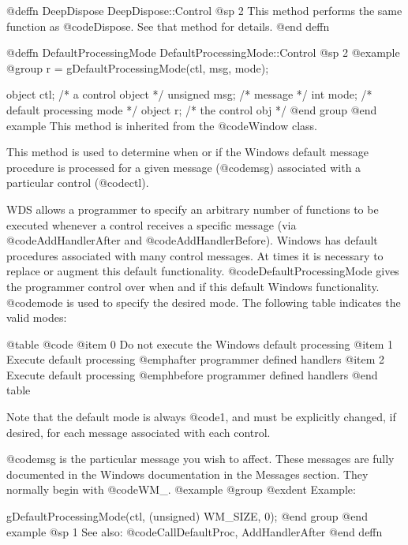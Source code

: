 @deffn {DeepDispose} DeepDispose::Control
@sp 2
This method performs the same function as @code{Dispose}.  See that
method for details.
@end deffn









@deffn {DefaultProcessingMode} DefaultProcessingMode::Control
@sp 2
@example
@group
r = gDefaultProcessingMode(ctl, msg, mode);

object   ctl;   /*  a control object         */
unsigned msg;   /*  message                  */
int      mode;  /*  default processing mode  */
object   r;     /*  the control obj          */
@end group
@end example
This method is inherited from the @code{Window} class.

This method is used to determine when or if the Windows default message
procedure is processed for a given message (@code{msg}) associated with
a particular control (@code{ctl}).

WDS allows a programmer to specify an arbitrary number of functions
to be executed whenever a control receives a specific message (via
@code{AddHandlerAfter} and @code{AddHandlerBefore}).  Windows has
default procedures associated with many control messages.  At times
it is necessary to replace or augment this default functionality.
@code{DefaultProcessingMode} gives the programmer control over when and
if this default Windows functionality.  @code{mode} is used to specify
the desired mode.  The following table indicates the valid modes:

@table @code
@item 0
Do not execute the Windows default processing
@item 1
Execute default processing @emph{after} programmer defined handlers
@item 2
Execute default processing @emph{before} programmer defined handlers
@end table

Note that the default mode is always @code{1}, and must be explicitly
changed, if desired, for each message associated with each control.

@code{msg} is the particular message you wish to affect.  These messages
are fully documented in the Windows documentation in the Messages
section.  They normally begin with @code{WM_}.
@example
@group
@exdent Example:

gDefaultProcessingMode(ctl, (unsigned) WM_SIZE, 0);
@end group
@end example
@sp 1
See also:  @code{CallDefaultProc, AddHandlerAfter}
@end deffn











